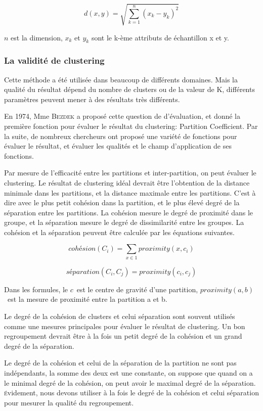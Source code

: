 $$d(x,y) = \sqrt {\sum_{k=1}^n  (x_{k}-y_{k})^2}$$

$n$ est la dimension, $x_{k}$ et $ y_{k}$ sont le k-ème attributs de échantillon x et y.


\subsubsection{La validité de clustering}
Cette méthode a été utilisée dans beaucoup de différents domaines. Mais la qualité du résultat dépend du nombre de clusters ou de la valeur de K, différents paramètres peuvent mener à des résultats très différents.

En 1974, Mme \textsc{Bezdek} a proposé cette question de d'évaluation, et donné la première fonction pour évaluer le résultat du clustering: \textsf{Partition}  \textsf{Coefficient}. Par la suite, de nombreux chercheurs ont proposé une variété de fonctions pour évaluer le résultat, et évaluer les qualités et le champ d'application de ses fonctions. 

Par mesure de l'efficacité entre les partitions et inter-partition, on peut évaluer le clustering. Le résultat de clustering idéal devrait être l'obtention de la distance minimale dans les partitions, et la distance maximale entre les partitions. C'est à dire avec le plus petit cohésion dans la partition, et le plus élevé degré de la séparation entre les partitions. La cohésion mesure le degré de proximité dans le groupe, et la séparation mesure le degré de dissimilarité entre les groupes. La cohésion et la séparation peuvent être calculée par les équations suivantes.

$$cohésion(C_{i}) = \sum_{x\in1} proximity(x, c_{i})$$

$$séparation(C_{i},C_{j}) = proximity(c_{i}, c_{j})$$


Dans les formules, le \(c\)\ est le centre de gravité d'une partition, \(proximity(a,b)\)\ est la mesure de proximité entre la partition a et b.

Le degré de la cohésion de clusters et celui séparation sont souvent utilisés comme une mesures principales pour évaluer le résultat de clustering. Un bon regroupement devrait être à la fois un petit degré de la cohésion et un grand degré de la séparation.

Le degré de la cohésion et celui de la séparation de la partition ne sont pas indépendants, la somme des deux est une constante, on suppose que quand on a le minimal degré de la cohésion, on peut avoir le maximal degré de la séparation. \textsc{é}videment, nous devons utiliser à la fois le degré de la cohésion et celui séparation pour mesurer la qualité du regroupement.

